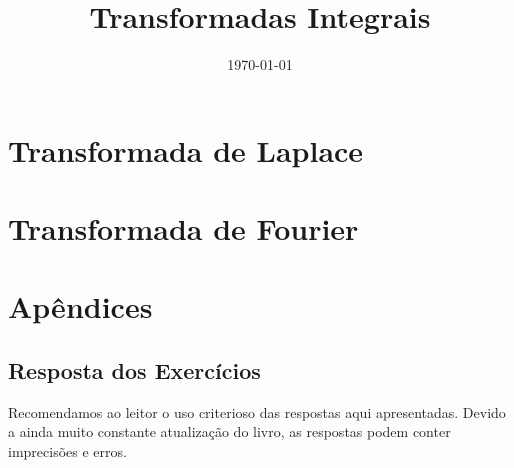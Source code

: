 \documentclass[12pt]{book}
\begin{document}
\frontmatter
\title{Transformadas Integrais}
\date{\today}
\author{}
\maketitle










\tableofcontents


\mainmatter


\part{Transformada de Laplace}











\part{Transformada de Fourier}











%

\part{Apêndices}
\appendix




\chapter*{Resposta dos Exercícios}
Recomendamos ao leitor o uso criterioso das respostas aqui apresentadas. Devido a ainda muito constante atualização do livro, as respostas podem conter imprecisões e erros.
\shipoutAnswer  





\end{document}
